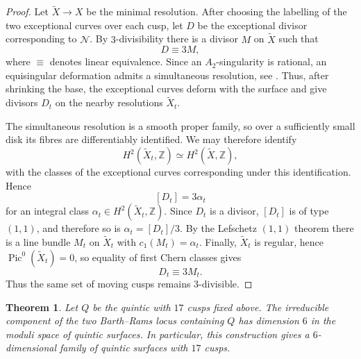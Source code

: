\documentclass[10pt,a4paper]{article}
\newtheorem{theorem}{Theorem}
\begin{document}
\begin{proof}
Let $\widetilde X\to X$ be the minimal resolution.  After choosing the
labelling of the two exceptional curves over each cusp, let $D$ be the
exceptional divisor corresponding to $\mathcal N$.  By $3$-divisibility there
is a divisor $M$ on $\widetilde X$ such that
\[
        D\equiv 3M,
\]
where $\equiv$ denotes linear equivalence.
Since an $A_2$-singularity is rational, an equisingular deformation admits a
simultaneous resolution, see \cite[Theorem~5.16]{Wahl76}.  Thus, after
shrinking the base, the exceptional curves deform with the surface and give
divisors $D_t$ on the nearby resolutions $\widetilde X_t$.

The simultaneous resolution is a smooth proper family, so over a sufficiently
small disk its fibres are differentiably identified.  We may therefore
identify
\[
        H^2(\widetilde X_t,\mathbb Z)
        \simeq H^2(\widetilde X,\mathbb Z),
\]
with the classes of the exceptional curves corresponding under this
identification.  Hence
\[
        [D_t]=3\alpha_t
\]
for an integral class $\alpha_t\in H^2(\widetilde X_t,\mathbb Z)$.  Since
$D_t$ is a divisor, $[D_t]$ is of type $(1,1)$, and therefore so is
$\alpha_t=[D_t]/3$.  By the Lefschetz $(1,1)$ theorem there is a line bundle
$M_t$ on $\widetilde X_t$ with $c_1(M_t)=\alpha_t$.  Finally,
$\widetilde X_t$ is regular, hence $\operatorname{Pic}^0(\widetilde X_t)=0$,
so equality of first Chern classes gives
\[
        D_t\equiv 3M_t.
\]
Thus the same set of moving cusps remains $3$-divisible.
\end{proof}

\begin{theorem}
\label{prop:two-BR-dimension}
Let $Q$ be the quintic with $17$ cusps fixed above.
The irreducible component of the two Barth--Rams locus containing $Q$ has 
dimension $6$ in the moduli space of quintic surfaces. In particular, this
construction gives a $6$-dimensional family of quintic surfaces with $17$
cusps.
\end{theorem}
\end{document}
